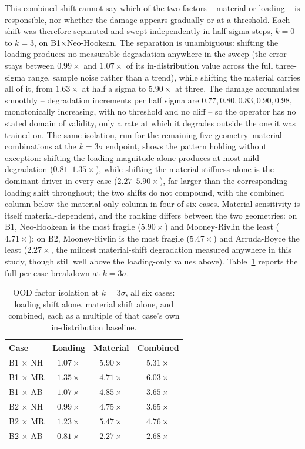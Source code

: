\documentclass[final,5p,times]{elsarticle}
\begin{document}
This combined shift cannot say which of the two factors -- material
or loading -- is responsible, nor whether the damage appears gradually or
at a threshold. Each shift was therefore separated and swept independently
in half-sigma steps, $k=0$ to $k=3$, on B1$\times$Neo-Hookean. The
separation is unambiguous: shifting the loading produces no measurable
degradation anywhere in the sweep (the error stays between $0.99\times$
and $1.07\times$ of its in-distribution value across the full three-sigma
range, sample noise rather than a trend), while shifting the material
carries all of it, from $1.63\times$ at half a sigma to $5.90\times$ at
three. The damage accumulates smoothly -- degradation increments per half
sigma are $0.77,0.80,0.83,0.90,0.98$, monotonically increasing, with no
threshold and no cliff -- so the operator has no stated domain of
validity, only a rate at which it degrades outside the one it was trained
on. The same isolation, run for the remaining five geometry--material
combinations at the $k{=}3\sigma$ endpoint, shows the pattern holding
without exception: shifting the loading magnitude alone produces at most
mild degradation ($0.81$--$1.35\times$), while shifting the material
stiffness alone is the dominant driver in every case ($2.27$--$5.90\times$),
far larger than the corresponding loading shift
throughout; the two shifts do not compound, with the combined column
below the material-only column in four of six cases. Material sensitivity
is itself material-dependent, and the ranking differs between the two
geometries: on B1, Neo-Hookean is the most fragile ($5.90\times$) and
Mooney-Rivlin the least ($4.71\times$); on B2, Mooney-Rivlin is the most
fragile ($5.47\times$) and Arruda-Boyce the least ($2.27\times$, the
mildest material-shift degradation measured anywhere in this study,
though still well above the loading-only values above). Table~\ref{tab:ood-isolation}
reports the full per-case
breakdown at $k{=}3\sigma$.

\begin{table}[h]
\centering
\caption{OOD factor isolation at $k{=}3\sigma$, all six cases: loading
  shift alone, material shift alone, and combined, each as a multiple
  of that case's own in-distribution baseline.}
\label{tab:ood-isolation}
\small
\begin{tabular}{lccc}
\toprule
Case & Loading & Material & Combined \\
\midrule
B1 $\times$ NH & $1.07\times$ & $5.90\times$ & $5.31\times$ \\
B1 $\times$ MR & $1.35\times$ & $4.71\times$ & $6.03\times$ \\
B1 $\times$ AB & $1.07\times$ & $4.85\times$ & $3.65\times$ \\
B2 $\times$ NH & $0.99\times$ & $4.75\times$ & $3.65\times$ \\
B2 $\times$ MR & $1.23\times$ & $5.47\times$ & $4.76\times$ \\
B2 $\times$ AB & $0.81\times$ & $2.27\times$ & $2.68\times$ \\
\bottomrule
\end{tabular}
\end{table}
\end{document}
